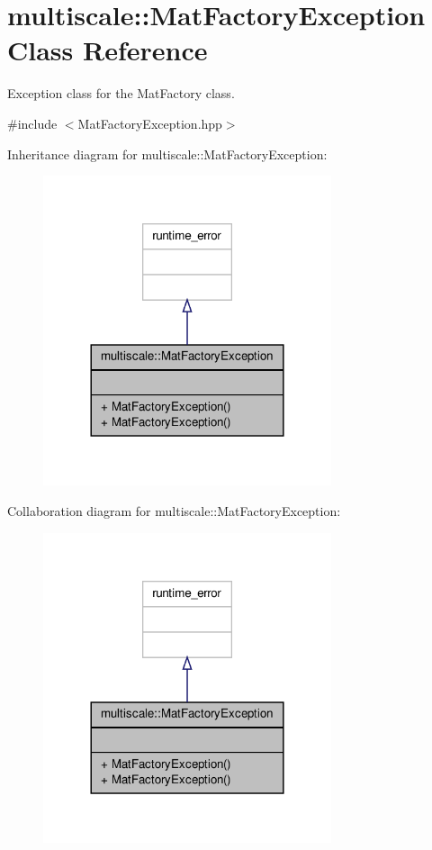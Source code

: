 \hypertarget{classmultiscale_1_1MatFactoryException}{\section{multiscale\-:\-:Mat\-Factory\-Exception Class Reference}
\label{classmultiscale_1_1MatFactoryException}
}


Exception class for the Mat\-Factory class.  




{\ttfamily \#include $<$Mat\-Factory\-Exception.\-hpp$>$}



Inheritance diagram for multiscale\-:\-:Mat\-Factory\-Exception\-:\nopagebreak
\begin{figure}[H]
\begin{center}
\leavevmode
\includegraphics[width=240pt]{classmultiscale_1_1MatFactoryException__inherit__graph}
\end{center}
\end{figure}


Collaboration diagram for multiscale\-:\-:Mat\-Factory\-Exception\-:\nopagebreak
\begin{figure}[H]
\begin{center}
\leavevmode
\includegraphics[width=240pt]{classmultiscale_1_1MatFactoryException__coll__graph}
\end{center}
\end{figure}
